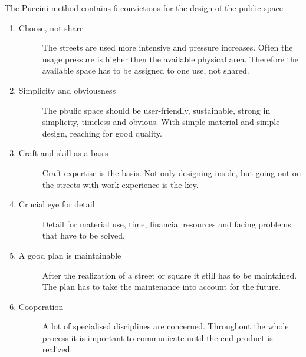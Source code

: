 The Puccini method contains 6 convictions for the design of the public space :~\cite{puccini2014}
\begin{enumerate}
\item 	\begin{description}
		\item[Choose, not share] 
		The streets are used more intensive and pressure increases. Often the usage pressure is higher then the available physical area. Therefore the available space has to be assigned to one use, not shared. 
		\end{description}
\item \begin{description}
		\item[Simplicity and obviousness] 
		The pbulic space should be user-friendly, sustainable, strong in simplicity, timeless and obvious. With simple material and simple design, reaching for good quality.
		\end{description}
\item \begin{description}
		\item[Craft and skill as a basis] Craft expertise is the basis. Not only designing inside, but going out on the streets with work experience is the key. 
		\end{description}
\item \begin{description}
		\item[Crucial eye for detail] Detail for material use, time, financial resources and facing problems that have to be solved. 
		\end{description}
\item \begin{description}
		\item[A good plan is maintainable] After the realization of a street or square it still has to be maintained. The plan has to take the maintenance into account for the future. 
		\end{description}
\item \begin{description}
		\item[Cooperation] A lot of specialised disciplines are concerned. Throughout the whole process it is important to communicate until the end product is realized. 
		\end{description}
\end{enumerate}

